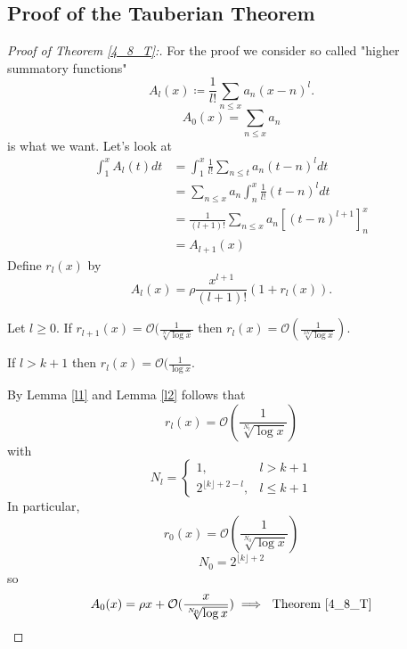 \documentclass[NumTh.tex]{subfiles}
\begin{document}
\subsection{Proof of the Tauberian Theorem}

\begin{proof}[Proof of Theorem \ref{4_8_T}:]
  For the proof we consider so called "higher summatory functions"
  \[ A_l(x) \coloneq \frac{1}{l!} \sum_{n \leq x} a_n (x-n)^l \text{.} \]
  \[ A_0(x) = \sum_{n \leq x} a_n \]
  is what we want.
  Let's look at
  \begin{align*}
    \int_1^x A_l(t) dt &= \int_1^x \frac{1}{l!} \sum_{n \leq t} a_n ( t-n)^l dt \\
    &= \sum_{n \leq x} a_n \int_n^x \frac{1}{l!} (t-n)^l dt \\
    &= \frac{1}{(l+1)!} \sum_{n \leq x} a_n [(t-n)^{l+1}]_n^x \\
    &= A_{l+1}(x)
  \end{align*}
  Define $r_l(x)$ by 
  \[ A_l(x) = \rho \frac{x^{l+1}}{(l+1)!} (1 + r_l(x)) \text{.} \]
  \begin{lemma}\label{l1}
    Let $l \geq 0$. If $r_{l+1}(x) = \mathcal{O}(\frac{1}{\sqrt[N]{\log x}}$ then $r_l(x) = \mathcal{O}( \frac{1}{\sqrt[2N]{\log x}})$.
  \end{lemma}
  \begin{lemma}\label{l2}
    If $l > k+1$ then $r_l(x) = \mathcal{O}( \frac{1}{\log x}$.
  \end{lemma}
  By Lemma \ref{l1} and Lemma \ref{l2} follows that
  \[ r_l(x) = \mathcal{O}(\frac{1}{\sqrt[N_l]{\log x}})\]
  with 
  \[ N_l = \begin{cases}
    1, & l > k + 1 \\
    2^{\lfloor k \rfloor + 2 - l}, & l \leq k+1
  \end{cases} \]
  In particular, 
  \[ r_0(x) = \mathcal{O}(\frac{1}{\sqrt[N_0]{\log x}}) \]
  \[ N_0 = 2^{\lfloor k \rfloor + 2} \]
  so 
  \[ A_0(x) = \rho x + \mathcal{O}(\frac{x}{\sqrt[N_0]{\log x}}) \implies \text{ Theorem \ref{4_8_T}} \]
\end{proof}
\end{document}

